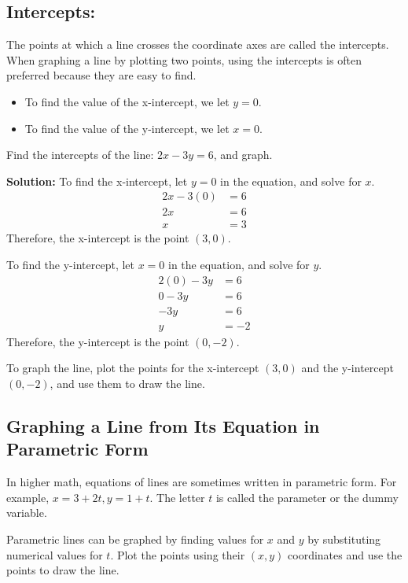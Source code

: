 \subsection{Intercepts:} The points at which a line crosses the coordinate axes are called the intercepts. When graphing a line by plotting two points, using the intercepts is often preferred because they are easy to find.
\begin{itemize}
    \item To find the value of the x-intercept, we let $y = 0$.
    \item To find the value of the y-intercept, we let $x = 0$.
\end{itemize}

\begin{example}
Find the intercepts of the line: $2x - 3y = 6$, and graph.
\end{example}

\textbf{Solution:} To find the x-intercept, let $y = 0$ in the equation, and solve for $x$.
\begin{align*}
2x - 3(0) &= 6 \\
2x &= 6 \\
x &= 3
\end{align*}
Therefore, the x-intercept is the point $(3, 0)$.

To find the y-intercept, let $x = 0$ in the equation, and solve for $y$.
\begin{align*}
2(0) - 3y &= 6 \\
0 - 3y &= 6 \\
-3y &= 6 \\
y &= -2
\end{align*}
Therefore, the y-intercept is the point $(0, -2)$.

To graph the line, plot the points for the x-intercept $(3, 0)$ and the y-intercept $(0, -2)$, and use them to draw the line.


\subsection{Graphing a Line from Its Equation in Parametric Form}

In higher math, equations of lines are sometimes written in parametric form. For example, $x = 3 + 2t, y = 1 + t$. The letter $t$ is called the parameter or the dummy variable.

Parametric lines can be graphed by finding values for $x$ and $y$ by substituting numerical values for $t$. Plot the points using their $(x, y)$ coordinates and use the points to draw the line.

